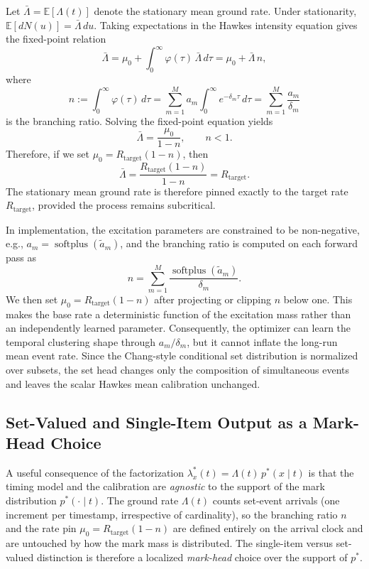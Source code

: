 Let $\bar{\Lambda}=\mathbb{E}[\Lambda(t)]$ denote the stationary mean ground rate. Under
stationarity, $\mathbb{E}[dN(u)]=\bar{\Lambda}\,du$. Taking expectations in the Hawkes
intensity equation gives the fixed-point relation
\[
\bar{\Lambda}
=\mu_0+\int_0^\infty \varphi(\tau)\,\bar{\Lambda}\,d\tau
=\mu_0+\bar{\Lambda}\,n,
\]
where
\[
n:=\int_0^\infty \varphi(\tau)\,d\tau
=\sum_{m=1}^{M}a_m\int_0^\infty e^{-\delta_m\tau}\,d\tau
=\sum_{m=1}^{M}\frac{a_m}{\delta_m}
\]
is the branching ratio. Solving the fixed-point equation yields
\[
\bar{\Lambda}=\frac{\mu_0}{1-n},\qquad n<1.
\]
Therefore, if we set $\mu_0=R_{\mathrm{target}}(1-n)$, then
\[
\bar{\Lambda}=\frac{R_{\mathrm{target}}(1-n)}{1-n}=R_{\mathrm{target}}.
\]
The stationary mean ground rate is therefore pinned exactly to the target rate
$R_{\mathrm{target}}$, provided the process remains subcritical.

In implementation, the excitation parameters are constrained to be non-negative, e.g.,
$a_m=\operatorname{softplus}(\tilde{a}_m)$, and the branching ratio is computed on each
forward pass as
\[
n=\sum_{m=1}^{M}\frac{\operatorname{softplus}(\tilde{a}_m)}{\delta_m}.
\]
We then set $\mu_0=R_{\mathrm{target}}(1-n)$ after projecting or clipping $n$ below one.
This makes the base rate a deterministic function of the excitation mass rather than an
independently learned parameter. Consequently, the optimizer can learn the temporal
clustering shape through $a_m/\delta_m$, but it cannot inflate the long-run mean event
rate. Since the Chang-style conditional set distribution is normalized over subsets, the
set head changes only the composition of simultaneous events and leaves the scalar Hawkes
mean calibration unchanged.

\subsection{Set-Valued and Single-Item Output as a Mark-Head Choice}
\label{subsec:mark_head_choice}

A useful consequence of the factorization $\lambda_x^*(t)=\Lambda(t)\,p^*(x\mid t)$ is that
the timing model and the calibration are \emph{agnostic} to the support of the mark
distribution $p^*(\cdot\mid t)$. The ground rate $\Lambda(t)$ counts set-event arrivals
(one increment per timestamp, irrespective of cardinality), so the branching ratio $n$ and
the rate pin $\mu_0=R_{\mathrm{target}}(1-n)$ are defined entirely on the arrival clock and
are untouched by how the mark mass is distributed. The single-item versus set-valued
distinction is therefore a localized \emph{mark-head} choice over the support of $p^*$.

